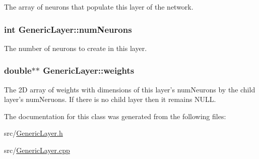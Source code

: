 The array of neurons that populate this layer of the network. \hypertarget{classGenericLayer_7b45631903aa50e67fe5a1947fc292bd}{
\subsubsection{\setlength{\rightskip}{0pt plus 5cm}int {\bf GenericLayer::numNeurons}}}
\label{classGenericLayer_7b45631903aa50e67fe5a1947fc292bd}


The number of neurons to create in this layer. \hypertarget{classGenericLayer_e75dc38537415bb12a60fbbbbb4b3d75}{
\subsubsection{\setlength{\rightskip}{0pt plus 5cm}double$\ast$$\ast$ {\bf GenericLayer::weights}}}
\label{classGenericLayer_e75dc38537415bb12a60fbbbbb4b3d75}


The 2D array of weights with dimensions of this layer's numNeurons by the child layer's numNeruons. If there is no child layer then it remains NULL. 

The documentation for this class was generated from the following files:\begin{CompactItemize}
\item 
src/\hyperlink{GenericLayer_8h}{GenericLayer.h}\item 
src/\hyperlink{GenericLayer_8cpp}{GenericLayer.cpp}\end{CompactItemize}
